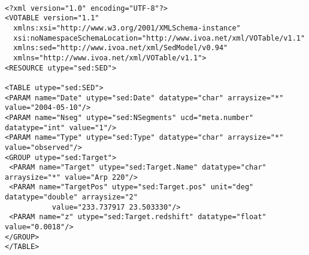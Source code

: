 \documentclass[11pt]{article}
\newenvironment{fmpage}
     {\begin{lrbox}{\fmbox}\begin{minipage}{6.5in}}
     {\end{minipage}\end{lrbox}\colorbox{iblue}{\fbox{\usebox{\fmbox}}}}
\begin{document}
{ \footnotesize
\begin{flushleft}


\begin{fmpage}

\begin{verbatim}

<?xml version="1.0" encoding="UTF-8"?>
<VOTABLE version="1.1"
  xmlns:xsi="http://www.w3.org/2001/XMLSchema-instance"
  xsi:noNamespaceSchemaLocation="http://www.ivoa.net/xml/VOTable/v1.1"
  xmlns:sed="http://www.ivoa.net/xml/SedModel/v0.94"
  xmlns="http://www.ivoa.net/xml/VOTable/v1.1">
<RESOURCE utype="sed:SED">

<TABLE utype="sed:SED">   
<PARAM name="Date" utype="sed:Date" datatype="char" arraysize="*" value="2004-05-10"/>
<PARAM name="Nseg" utype="sed:NSegments" ucd="meta.number" datatype="int" value="1"/>
<PARAM name="Type" utype="sed:Type" datatype="char" arraysize="*" value="observed"/>
<GROUP utype="sed:Target">
 <PARAM name="Target" utype="sed:Target.Name" datatype="char" arraysize="*" value="Arp 220"/>
 <PARAM name="TargetPos" utype="sed:Target.pos" unit="deg" datatype="double" arraysize="2" 
           value="233.737917 23.503330"/>
 <PARAM name="z" utype="sed:Target.redshift" datatype="float" value="0.0018"/>
</GROUP>
</TABLE>


\end{verbatim}
\end{fmpage}
\end{flushleft}}
\end{document}
